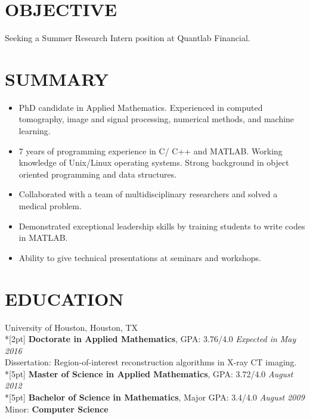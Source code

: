 \documentclass[margin,line,10pt]{res} %
\begin{document}
\begin{resume}


\section{OBJECTIVE}  
Seeking a Summer Research Intern position at Quantlab Financial.

\section{SUMMARY} 
\begin{itemize}[leftmargin=12pt] \itemsep -1pt 
\item PhD candidate in Applied Mathematics. Experienced in computed tomography, image and signal processing, numerical methods, and machine learning.
\item 7 years of programming experience in C/ C++ and MATLAB. Working knowledge of Unix/Linux operating systems. Strong background in object oriented programming and data structures.
\item Collaborated with a team of multidisciplinary researchers and solved a medical problem.
\item Demonstrated exceptional leadership skills by training students to write codes in MATLAB.
\item Ability to give technical presentations at seminars and workshops.
\end{itemize}


\section{EDUCATION}
{University of Houston, Houston, TX}
\\*[2pt]
{\bf Doctorate in Applied Mathematics}, GPA: 3.76/4.0 \hfill {\em Expected in May 2016} \\ 
Dissertation: Region-of-interest reconstruction algorithms in X-ray CT imaging. 
 \\*[5pt]
{\bf Master of Science in Applied Mathematics}, GPA: 3.72/4.0 \hfill {\em August 2012} 
 \\*[5pt]
{\bf Bachelor of Science in Mathematics}, Major GPA: 3.4/4.0  \hfill {\em August 2009} \\
Minor: \textbf{Computer Science}


\end{resume}
\end{document}
